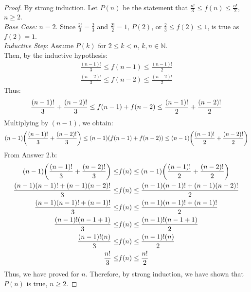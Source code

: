 \documentclass[11pt]{scrartcl}
\theoremstyle{dotlessP}
\theoremstyle{dotlessN}
\DeclarePairedDelimiter\paren{(}{)} %
\newcommand{\nats}{\mathbb{N}}
\begin{document}
\begin{ans}
\
\begin{proof}
	
	By strong induction. Let $P(n)$ be the statement that $\displaystyle \frac{n!}{3} \leq f(n) \leq \frac{n!}{2}$,  $n \geq 2$.
	\\
	
	\textit{Base Case:} $n = 2$. Since $\displaystyle \frac{2!}{3} = \frac{2}{3}$ and $\displaystyle \frac{2!}{2} = 1$,  $P(2)$, or  $\displaystyle \frac{2}{3} \leq f(2) \leq 1$, is true as $f(2) = 1$.
\\

\textit{Inductive Step}: Assume $P(k)$ for $2 \leq k < n$, $k,n \in \nats$. 
\\

Then, by the inductive hypothesis:
\begin{align*}
	\frac{(n-1)!}{3} \leq f(n-1) \leq \frac{(n-1)!}{2} \\
	\frac{(n-2)!}{3} \leq f(n-2) \leq \frac{(n-2)!}{2}
\end{align*}
Thus:
\[
\frac{(n-1)!}{3} + \frac{(n-2)!}{3} \leq f(n-1) + f(n-2) \leq \frac{(n-1)!}{2} + \frac{(n-2)!}{2} \\
\] 
Multiplying by $(n-1)$, we obtain: 
 \[
(n-1) \paren*{\frac{(n-1)!}{3} + \frac{(n-2)!}{3}} \leq (n-1)(f(n-1) + f(n-2)) \leq (n-1) \paren*{\frac{(n-1)!}{2} + \frac{(n-2)!}{2}}
\] 
From Answer 2.b:
\begin{align*}	
	(n-1) \paren*{\frac{(n-1)!}{3} + \frac{(n-2)!}{3}} \leq &f(n) \leq (n-1) \paren*{\frac{(n-1)!}{2} + \frac{(n-2)!}{2}} \\
	\frac{(n-1)(n-1)! + (n-1)(n-2)!}{3} \leq &f(n) \leq \frac{(n-1)(n-1)! + (n-1)(n-2)!}{2} \\
	\frac{(n-1)(n-1)! + (n-1)!}{3} \leq &f(n) \leq \frac{(n-1)(n-1)! + (n-1)!}{2} \\
	\frac{(n-1)!(n-1 + 1)}{3} \leq &f(n) \leq \frac{(n-1)!(n-1 + 1)}{2} \\
	\frac{(n-1)!(n)}{3} \leq &f(n) \leq \frac{(n-1)!(n)}{2} \\
	\frac{n!}{3} \leq &f(n) \leq \frac{n!}{2} \\
\end{align*}
Thus, we have proved for $n$. Therefore, by strong induction, we have shown that  $P(n)$ is true, $n \geq 2$.
\end{proof}
\end{ans}
\end{document}
